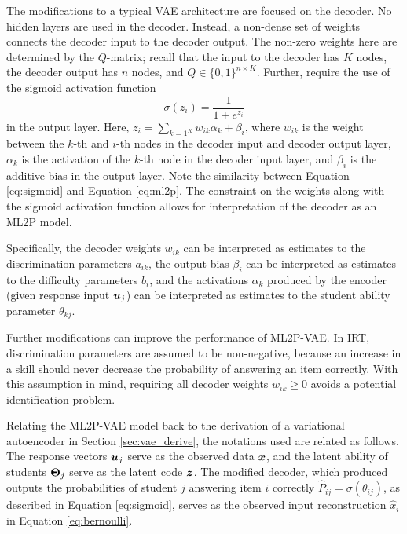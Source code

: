 The modifications to a typical VAE architecture are focused on the decoder. No hidden layers are used in the decoder. Instead, a non-dense set of weights connects the decoder input to the decoder output. The non-zero weights here are determined by the $Q$-matrix; recall that the input to the decoder has $K$ nodes, the decoder output has $n$ nodes, and $Q \in \{0,1\}^{n \times K}$. Further, require the use of the sigmoid activation function
\begin{equation}
  \sigma(z_i) = \frac{1}{1 + e^{z_i}}
  \label{eq:sigmoid}
\end{equation}
in the output layer. Here, $z_i = \sum_{k=1^K} w_{ik}\alpha_{k} + \beta_i$, where $w_{ik}$ is the weight between the $k$-th and $i$-th nodes in the decoder input and decoder output layer, $\alpha_k$ is the activation of the $k$-th node in the decoder input layer, and $\beta_i$ is the additive bias in the output layer. Note the similarity between Equation \ref{eq:sigmoid} and Equation \ref{eq:ml2p}. The constraint on the weights along with the sigmoid activation function allows for interpretation of the decoder as an ML2P model.

Specifically, the decoder weights $w_{ik}$ can be interpreted as estimates to the discrimination parameters $a_{ik}$, the output bias $\beta_i$ can be interpreted as estimates to the difficulty parameters $b_i$, and the activations $\alpha_k$ produced by the encoder (given response input $\boldsymbol{u}_j$) can be interpreted as estimates to the student ability parameter $\theta_{kj}$. 

Further modifications can improve the performance of ML2P-VAE. In IRT, discrimination parameters are assumed to be non-negative, because an increase in a skill should never decrease the probability of answering an item correctly. With this assumption in mind, requiring all decoder weights $w_{ik} \geq 0$ avoids a potential identification problem. 

Relating the ML2P-VAE model back to the derivation of a variational autoencoder in Section \ref{sec:vae_derive}, the notations used are related as follows. The response vectors $\boldsymbol{u}_j$ serve as the observed data $\boldsymbol{x}$, and the latent ability of students $\boldsymbol{\Theta}_j$ serve as the latent code $\boldsymbol{z}$. The modified decoder, which produced outputs the probabilities of student $j$ answering item $i$ correctly $\hat P_{ij} = \sigma(\theta_{ij})$, as described in Equation \ref{eq:sigmoid}, serves as the observed input reconstruction $\hat x_i$ in Equation \ref{eq:bernoulli}.

